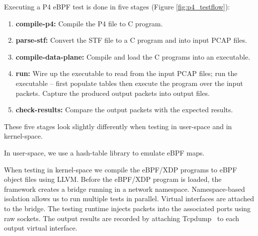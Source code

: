 Executing a P4 eBPF test is done in five stages (Figure
\ref{fig:p4_testflow}):

\begin{enumerate}
\item\textbf{compile-p4:} Compile the P4 file to C program.
\item \textbf{parse-stf:} Convert the STF file to a C program and into
  input PCAP files.
\item \textbf{compile-data-plane:} Compile and load the C programs
  into an executable.
\item \textbf{run:} Wire up the executable to read from the input PCAP
  files; run the executable -- first populate tables then execute the
  program over the input packets.  Capture the produced output packets
  into output files.
\item \textbf{check-results:} Compare the output packets with the
  expected results.
\end{enumerate}

\noindent These five stages look slightly differently when testing in
user-space and in kernel-space.

In user-space, we use a hash-table library to emulate eBPF maps.

When testing in kernel-space we compile the eBPF/XDP programs to eBPF
object files using LLVM.  Before the eBPF/XDP program is loaded, the
framework creates a bridge running in a network namespace.
Namespace-based isolation allows us to run multiple tests in parallel.
Virtual interfaces are attached to the bridge.  The testing runtime
injects packets into the associated ports using raw sockets. The
output results are recorded by attaching Tcpdump~\cite{tcpdump} to
each output virtual interface.
